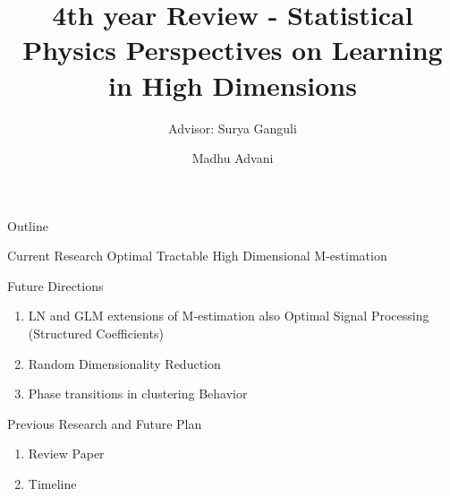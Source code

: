 \documentclass[pdf]{beamer}
\title[Physics of Learning]{4th year Review - Statistical Physics Perspectives on Learning in High Dimensions}
\subtitle{Advisor: Surya Ganguli}
\author{Madhu Advani}
\institute{Stanford University}
\begin{document}
\begin{frame}
    \titlepage
\end{frame}

\begin{frame}{Outline}
\begin{block}{Current Research}
Optimal Tractable High Dimensional M-estimation
\end{block}
\vspace{.1in}
\begin{block}{Future Directions}
    \begin{enumerate}
        \item LN and GLM extensions of M-estimation also Optimal Signal Processing (Structured Coefficients)
        \item Random Dimensionality Reduction
        \item Phase transitions in clustering Behavior
    \end{enumerate}
\end{block}
\vspace{.1in}
\begin{block}{Previous Research and Future Plan}
    \begin{enumerate}
        \item Review Paper
        \item Timeline
    \end{enumerate}
\end{block}
\end{frame}
\end{document}
